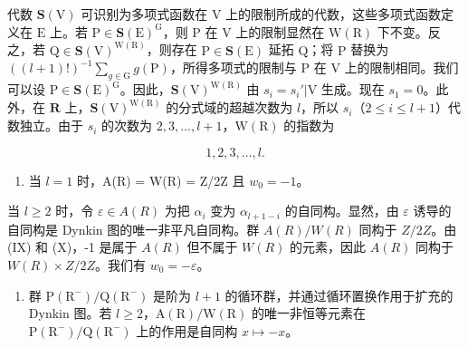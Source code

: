 代数 \(\mathbf{S}(\mathrm{V})\) 可识别为多项式函数在 \(\mathrm{V}\) 上的限制所成的代数，这些多项式函数定义在 \(\mathrm{E}\) 上。若 \(\mathrm{P} \in \mathbf{S}(\mathrm{E})^{\mathrm{G}}\)，则 \(\mathrm{P}\) 在 \(\mathrm{V}\) 上的限制显然在 \(\mathrm{W}(\mathrm{R})\) 下不变。反之，若 \(\mathrm{Q} \in \mathbf{S}(\mathrm{V})^{\mathrm{W}(\mathrm{R})}\)，则存在 \(\mathrm{P} \in \mathbf{S}(\mathrm{E})\) 延拓 \(\mathrm{Q}\)；将 \(\mathrm{P}\) 替换为 \(((l + 1)!)^{-1} \sum_{g \in \mathrm{G}} g(\mathrm{P})\)，所得多项式的限制与 \(\mathrm{P}\) 在 \(\mathrm{V}\) 上的限制相同。我们可以设 \(\mathrm{P} \in \mathbf{S}(\mathrm{E})^{\mathrm{G}}\)。因此，\(\mathbf{S}(\mathrm{V})^{\mathrm{W}(\mathrm{R})}\) 由 \(s_i = s_i'|\mathrm{V}\) 生成。现在 \(s_1 = 0\)。此外，在 \(\mathbf{R}\) 上，\(\mathbf{S}(\mathrm{V})^{\mathrm{W}(\mathrm{R})}\) 的分式域的超越次数为 \(l\)，所以 \(s_i\)（\(2 \leqslant i \leqslant l + 1\)）代数独立。由于 \(s_i\) 的次数为 \(2, 3, \ldots, l + 1\)，\(\mathrm{W}(\mathrm{R})\) 的指数为

\[
1, 2, 3, \dots , l.
\]

\begin{enumerate}
\def\labelenumi{(\Roman{enumi})}
\setcounter{enumi}{10}
\tightlist
\item
  当 \(l = 1\) 时，A(R) = W(R) = Z/2Z 且 \(w_0 = -1\)。
\end{enumerate}

当 \(l \geqslant 2\) 时，令 \(\varepsilon \in A(R)\) 为把 \(\alpha_i\) 变为 \(\alpha_{l+1-i}\) 的自同构。显然，由 \(\varepsilon\) 诱导的自同构是 Dynkin 图的唯一非平凡自同构。群 \(A(R)/W(R)\) 同构于 \(Z/2Z\)。由 (IX) 和 (X)，-1 是属于 \(A(R)\) 但不属于 \(W(R)\) 的元素，因此 \(A(R)\) 同构于 \(W(R) \times Z/2Z\)。我们有 \(w_0 = -\varepsilon\)。

\begin{enumerate}
\def\labelenumi{(\Roman{enumi})}
\setcounter{enumi}{11}
\tightlist
\item
  群 \(\mathrm{P}(\mathrm{R}^{-})/\mathrm{Q}(\mathrm{R}^{-})\) 是阶为 \(l+1\) 的循环群，并通过循环置换作用于扩充的 Dynkin 图。若 \(l\geqslant2\)，\(\mathrm{A}(\mathrm{R})/\mathrm{W}(\mathrm{R})\) 的唯一非恒等元素在 \(\mathrm{P}(\mathrm{R}^{-})/\mathrm{Q}(\mathrm{R}^{-})\) 上的作用是自同构 \(x\mapsto-x\)。
\end{enumerate}

